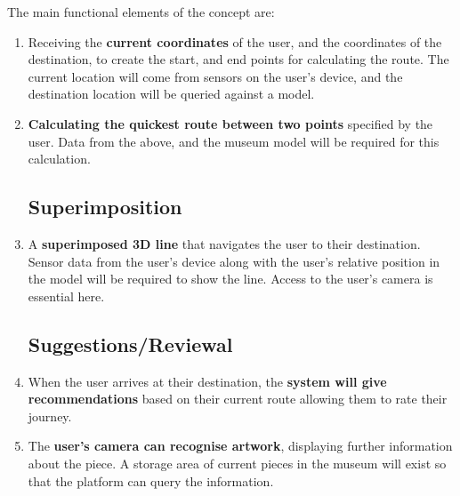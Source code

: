 
The main functional elements of the concept are:

\begin{enumerate}
\subsection*{Route Calculations}
    \item Receiving the \textbf{current coordinates} of the user, and the coordinates of the destination, to create the start, and end points for calculating the route. The current location will come from sensors on the user's device, and the destination location will be queried against a model.
    \item \textbf{Calculating the quickest route between two points} specified by the user. Data from the above, and the museum model will be required for this calculation.

\subsection*{Superimposition}
    \item A \textbf{superimposed 3D line} that navigates the user to their destination. Sensor data from the user's device along with the user's relative position in the model will be required to show the line. Access to the user's camera is essential here.

\subsection*{Suggestions/Reviewal}
    \item When the user arrives at their destination, the \textbf{system will give recommendations} based on their current route allowing them to rate their journey.
    \item The \textbf{user's camera can recognise artwork}, displaying further information about the piece. A storage area of current pieces in the museum will exist so that the platform can query the information.
\end{enumerate}
